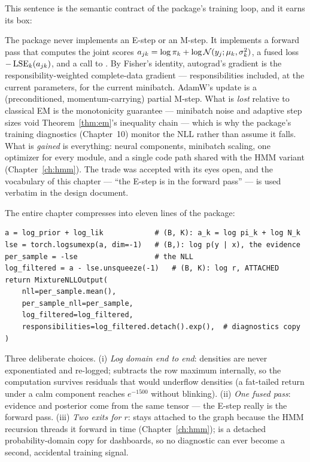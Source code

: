 This sentence is the semantic contract of the package's training loop, and
it earns its box:

\begin{engineering}
The package never implements an E-step or an M-step. It implements a
forward pass that computes the joint scores $a_{jk} = \log \pi_k + \log
\mathcal{N}(y_j; \mu_k, \sigma_k^2)$, a fused loss $-\operatorname{LSE}_k(a_{jk})$, and a
call to . By Fisher's identity, autograd's gradient
is the responsibility-weighted complete-data gradient --- responsibilities
included, at the current parameters, for the current minibatch. AdamW's
update is a (preconditioned, momentum-carrying) partial M-step. What is
\emph{lost} relative to classical EM is the monotonicity guarantee ---
minibatch noise and adaptive step sizes void Theorem~\ref{thm:em}'s
inequality chain --- which is why the package's training diagnostics
(Chapter~10) monitor the NLL rather than assume it
falls. What is \emph{gained} is everything: neural components, minibatch
scaling, one optimizer for every module, and a single code path shared
with the HMM variant (Chapter~\ref{ch:hmm}). The trade was accepted with
its eyes open, and the vocabulary of this chapter --- ``the E-step is in
the forward pass'' --- is used verbatim in the design document.
\end{engineering}

\begin{codewalk}
The entire chapter compresses into eleven lines of the package:
\begin{lstlisting}
a = log_prior + log_lik            # (B, K): a_k = log pi_k + log N_k
lse = torch.logsumexp(a, dim=-1)   # (B,): log p(y | x), the evidence
per_sample = -lse                  # the NLL
log_filtered = a - lse.unsqueeze(-1)   # (B, K): log r, ATTACHED
return MixtureNLLOutput(
    nll=per_sample.mean(),
    per_sample_nll=per_sample,
    log_filtered=log_filtered,
    responsibilities=log_filtered.detach().exp(),  # diagnostics copy
)
\end{lstlisting}
Three deliberate choices. (i) \emph{Log domain end to end}: densities are
never exponentiated and re-logged;  subtracts the row
maximum internally, so the computation survives residuals that would
underflow  densities (a fat-tailed return under a calm
component reaches $e^{-1500}$ without blinking). (ii) \emph{One fused
pass}: evidence and posterior come from the same tensor  ---
the E-step really is the forward pass. (iii) \emph{Two exits for $r$}:
 stays attached to the graph because the HMM recursion
threads it forward in time (Chapter~\ref{ch:hmm}); 
is a detached probability-domain copy for dashboards, so no diagnostic can
ever become a second, accidental training signal.
\end{codewalk}

